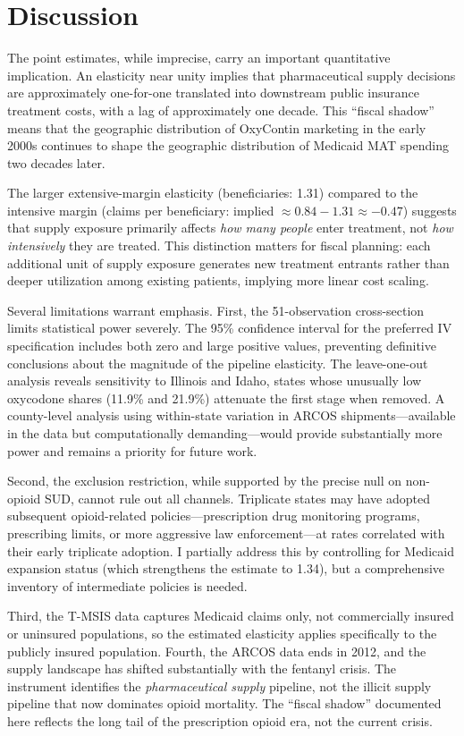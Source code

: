 \documentclass[12pt]{article}
\begin{document}
\section{Discussion}

The point estimates, while imprecise, carry an important quantitative implication. An elasticity near unity implies that pharmaceutical supply decisions are approximately one-for-one translated into downstream public insurance treatment costs, with a lag of approximately one decade. This ``fiscal shadow'' means that the geographic distribution of OxyContin marketing in the early 2000s continues to shape the geographic distribution of Medicaid MAT spending two decades later.

The larger extensive-margin elasticity (beneficiaries: 1.31) compared to the intensive margin (claims per beneficiary: implied $\approx 0.84 - 1.31 \approx -0.47$) suggests that supply exposure primarily affects \emph{how many people} enter treatment, not \emph{how intensively} they are treated. This distinction matters for fiscal planning: each additional unit of supply exposure generates new treatment entrants rather than deeper utilization among existing patients, implying more linear cost scaling.

Several limitations warrant emphasis. First, the 51-observation cross-section limits statistical power severely. The 95\% confidence interval for the preferred IV specification includes both zero and large positive values, preventing definitive conclusions about the magnitude of the pipeline elasticity. The leave-one-out analysis reveals sensitivity to Illinois and Idaho, states whose unusually low oxycodone shares (11.9\% and 21.9\%) attenuate the first stage when removed. A county-level analysis using within-state variation in ARCOS shipments---available in the data but computationally demanding---would provide substantially more power and remains a priority for future work.

Second, the exclusion restriction, while supported by the precise null on non-opioid SUD, cannot rule out all channels. Triplicate states may have adopted subsequent opioid-related policies---prescription drug monitoring programs, prescribing limits, or more aggressive law enforcement---at rates correlated with their early triplicate adoption. I partially address this by controlling for Medicaid expansion status (which strengthens the estimate to 1.34), but a comprehensive inventory of intermediate policies is needed.

Third, the T-MSIS data captures Medicaid claims only, not commercially insured or uninsured populations, so the estimated elasticity applies specifically to the publicly insured population. Fourth, the ARCOS data ends in 2012, and the supply landscape has shifted substantially with the fentanyl crisis. The instrument identifies the \emph{pharmaceutical supply} pipeline, not the illicit supply pipeline that now dominates opioid mortality. The ``fiscal shadow'' documented here reflects the long tail of the prescription opioid era, not the current crisis.
\end{document}
